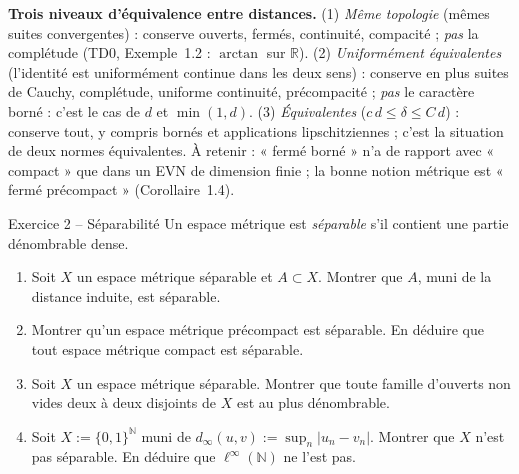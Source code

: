 \documentclass[11pt,a4paper]{article}
\newcommand{\R}{\mathbb{R}}
\newcommand{\N}{\mathbb{N}}
\theoremstyle{definition}
\begin{document}
\begin{pointcle}
\textbf{Trois niveaux d'équivalence entre distances.} (1) \emph{Même topologie} (mêmes suites convergentes) : conserve ouverts, fermés, continuité, compacité ; \emph{pas} la complétude (TD0, Exemple~1.2 : $\arctan$ sur $\R$). (2) \emph{Uniformément équivalentes} (l'identité est uniformément continue dans les deux sens) : conserve en plus suites de Cauchy, complétude, uniforme continuité, précompacité ; \emph{pas} le caractère borné : c'est le cas de $d$ et $\min(1,d)$. (3) \emph{Équivalentes} ($c\,d\le\delta\le C\,d$) : conserve tout, y compris bornés et applications lipschitziennes ; c'est la situation de deux normes équivalentes. À retenir : « fermé borné » n'a de rapport avec « compact » que dans un EVN de dimension finie ; la bonne notion métrique est « fermé précompact » (Corollaire~1.4).
\end{pointcle}

\begin{exo}{Exercice 2 -- Séparabilité}
Un espace métrique est \emph{séparable} s'il contient une partie dénombrable dense.
\begin{enumerate}[label=(\alph*)]
  \item Soit $X$ un espace métrique séparable et $A\subset X$. Montrer que $A$, muni de la distance induite, est séparable.
  \item Montrer qu'un espace métrique précompact est séparable. En déduire que tout espace métrique compact est séparable.
  \item Soit $X$ un espace métrique séparable. Montrer que toute famille d'ouverts non vides deux à deux disjoints de $X$ est au plus dénombrable.
  \item Soit $X:=\{0,1\}^\N$ muni de $d_\infty(u,v):=\sup_n|u_n-v_n|$. Montrer que $X$ n'est pas séparable. En déduire que $\ell^\infty(\N)$ ne l'est pas.
\end{enumerate}
\end{exo}
\end{document}
